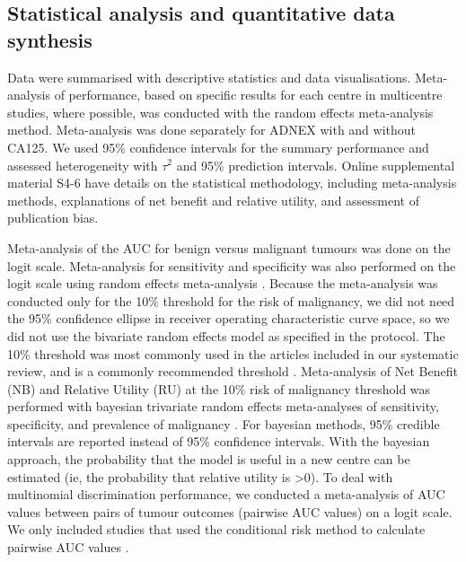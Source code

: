 \subsection{Statistical analysis and quantitative data synthesis}
Data were summarised with descriptive statistics and data visualisations. Meta-analysis of performance, based on specific results for each centre in multicentre studies, where possible, was conducted with the random effects meta-analysis method. Meta-analysis was done separately for ADNEX with and without CA125. We used 95\% confidence intervals for the summary performance and assessed heterogeneity with $\tau^2$ and 95\% prediction intervals. Online supplemental material S4-6 have details on the statistical methodology, including meta-analysis methods, explanations of net benefit and relative utility, and assessment of publication bias.

Meta-analysis of the \gls{AUC} for benign versus malignant tumours was done on the
logit scale. Meta-analysis for sensitivity and specificity was also performed on
the logit scale using random effects meta-analysis
 \cite{rileyBivariateRandomeffectsMetaanalysis2007}. Because the meta-analysis was conducted only for the 10\% threshold for the risk of malignancy, we did not need the 95\% confidence ellipse in receiver operating characteristic curve space, so we did not use the bivariate random effects model as specified in the protocol. The 10\% threshold was most commonly used in the articles included in our systematic review, and is a commonly recommended threshold \cite{timmermanESGOISUOGIOTA2021}. Meta-analysis of Net
Benefit (\gls{NB}) \cite{vickersDecisionCurveAnalysis2006} and Relative Utility (\gls{RU})
 \cite{bakerPuttingRiskPrediction2009} at the 10\% risk of malignancy threshold
was performed  with bayesian trivariate random effects meta-analyses of sensitivity, specificity, and prevalence of malignancy \cite{wynantsRandomeffectsMetaanalysisClinical2018}. For bayesian methods, 95\% credible intervals are reported instead of 95\% confidence intervals. With the bayesian approach, the probability that the model is useful in a new centre can be estimated (ie, the probability that relative utility is >0). To deal with multinomial discrimination performance, we conducted a meta-analysis of AUC values between pairs of tumour outcomes (pairwise AUC values) on a logit scale. We only included studies that used the conditional risk method to calculate pairwise AUC values \cite{vancalsterAssessingDiscriminativeAbility2012}. 

